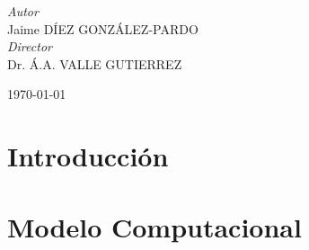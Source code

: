 \documentclass[a4paper, 11pt, oneside]{book}
\begin{document}
\begin{titlepage}
			
				\begin{flushright}
					\large
					\textit{Autor}\\
					Jaime \textsc{DÍEZ GONZÁLEZ-PARDO} \\ %
					\large
					\textit{Director}\\
					Dr. Á.A. \textsc{VALLE GUTIERREZ} %
				\end{flushright}
			
			
				\vfill\vfill\vfill %
				
				{\large\today} %
				
			
				\vfill %
		
		\end{titlepage}


		\tableofcontents



			\chapter{Introducción} %
				\label{Intr}

				
				
			\chapter{Modelo Computacional}
				\label{Mdl}
\end{document}
